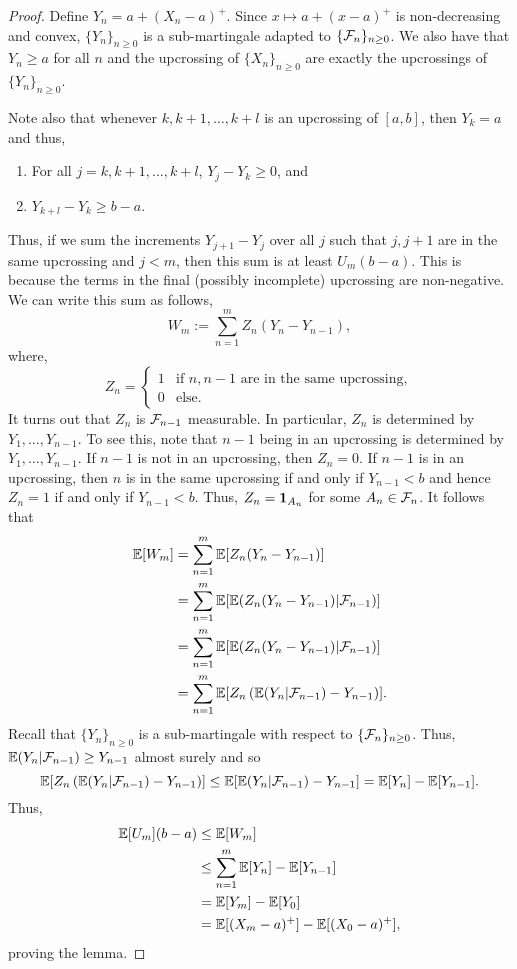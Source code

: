  \begin{proof}
     Define $Y_n = a+(X_n-a)^+$. Since $x \mapsto a+(x-a)^+$ is non-decreasing and convex, $\{Y_n\}_{n \ge 0}$ is a sub-martingale adapted to $\{{\mathcal{F}}_n\}_{n \ge 0}$. We also have that $Y_n \ge a$ for all $n$ and the upcrossing of $\{X_n\}_{n \ge 0}$ are exactly the upcrossings of $\{Y_n\}_{n \ge 0}$.

     Note also that whenever $k,k+1,\ldots,k+l$ is an upcrossing of $[a,b]$, then $Y_k = a$ and thus,
     \begin{enumerate}
            \item For all $j=k,k+1,\ldots, k+l$, $Y_j - Y_k \ge 0$, and
            \item $Y_{k+l}-Y_k \ge b-a$.
     \end{enumerate}
     Thus, if we sum the increments $Y_{j+1}-Y_j$ over all $j$ such that $j,j+1$ are in the same upcrossing and $j < m$, then this sum is at least $U_m(b-a)$. This is because the terms in the final (possibly incomplete) upcrossing are non-negative. We can write this sum as follows,
     \[W_m := \sum_{n=1}^m Z_n(Y_n - Y_{n-1}), \]
     where,
     \[Z_n = \begin{cases}
         1 & \text{if $n,n-1$ are in the same upcrossing},\\
         0 & \text{else}. 
     \end{cases}\]
     It turns out that $Z_n$ is ${\mathcal{F}}_{n-1}$ measurable. In particular, $Z_n$ is determined by $Y_1,\ldots,Y_{n-1}$. To see this, note that $n-1$ being in an upcrossing is determined by $Y_1,\ldots,Y_{n-1}$. If $n-1$ is not in an upcrossing, then $Z_n = 0$. If $n-1$ is in an upcrossing, then $n$ is in the same upcrossing if and only if $Y_{n-1} < b$ and hence $Z_n = 1$ if and only if $Y_{n-1} < b$. Thus, $Z_n = {{\bf 1}}_{A_n}$ for some $A_n \in {\mathcal{F}}_n$. It follows that 
     \begin{align*}
         {\mathbb{E}}[W_m] &=\sum_{n=1}^m {\mathbb{E}}[Z_n(Y_n-Y_{n-1})]\\
         &=\sum_{n=1}^m {\mathbb{E}}[{\mathbb{E}}(Z_n(Y_n-Y_{n-1})|{\mathcal{F}}_{n-1})]\\
         &=\sum_{n=1}^m {\mathbb{E}}[{\mathbb{E}}(Z_n(Y_n-Y_{n-1})|{\mathcal{F}}_{n-1})]\\
         &=\sum_{n=1}^m {\mathbb{E}}[Z_n\left({\mathbb{E}}(Y_n|{\mathcal{F}}_{n-1})-Y_{n-1}\right)].
     \end{align*} 
     Recall that $\{Y_n\}_{n \ge 0}$ is a sub-martingale with respect to $\{{\mathcal{F}}_n\}_{n \ge 0}$. Thus, ${\mathbb{E}}(Y_n|{\mathcal{F}}_{n-1}) \ge Y_{n-1}$ almost surely and so
     \[{\mathbb{E}}[Z_n\left({\mathbb{E}}(Y_n|{\mathcal{F}}_{n-1})-Y_{n-1}\right)] \le {\mathbb{E}}[{\mathbb{E}}(Y_n|{\mathcal{F}}_{n-1})-Y_{n-1}] = {\mathbb{E}}[Y_n]-{\mathbb{E}}[Y_{n-1}]. \]
     Thus,
     \begin{align*}
         {\mathbb{E}}[U_m](b-a)&\le {\mathbb{E}}[W_m]\\
         &\le \sum_{n=1}^m {\mathbb{E}}[Y_n]-{\mathbb{E}}[Y_{n-1}]\\
         &={\mathbb{E}}[Y_m] - {\mathbb{E}}[Y_0]\\
         &={\mathbb{E}}[(X_m-a)^+]-{\mathbb{E}}[(X_0-a)^+],
     \end{align*} 
     proving the lemma. 
 \end{proof}
